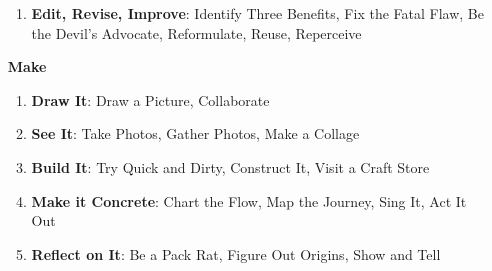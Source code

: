 \documentclass[11pt, oneside]{article}   	%
\begin{document}
\begin{enumerate}
\begin{enumerate}
	\item \textbf{Edit, Revise, Improve}: Identify Three Benefits, Fix the Fatal Flaw, Be the Devil's Advocate, Reformulate, Reuse, Reperceive
	\end{enumerate}
\item[\textbf{\huge Make}]
	\begin{enumerate}
	\item \textbf{Draw It}: Draw a Picture, Collaborate
	\item \textbf{See It}: Take Photos, Gather Photos, Make a Collage
	\item \textbf{Build It}: Try Quick and Dirty, Construct It, Visit a Craft Store
	\item \textbf{Make it Concrete}: Chart the Flow, Map the Journey, Sing It, Act It Out
	\item \textbf{Reflect on It}: Be a Pack Rat, Figure Out Origins, Show and Tell
	\end{enumerate}
\end{enumerate}
\end{document}
